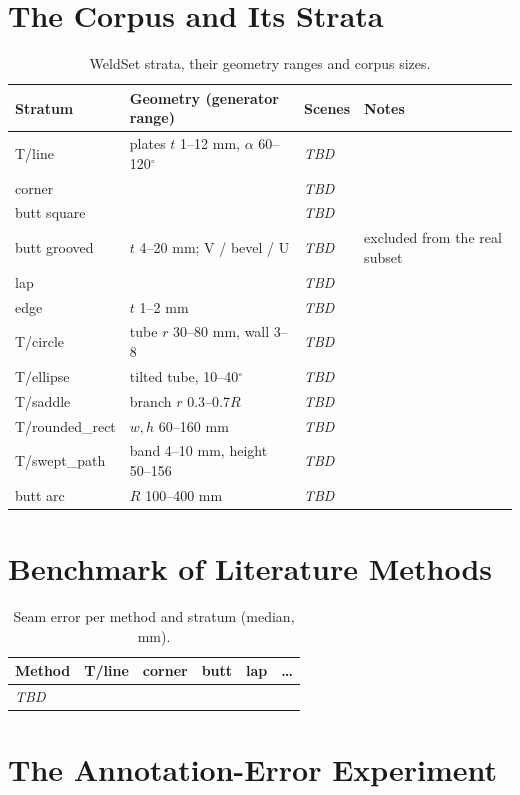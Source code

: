 \section{The Corpus and Its Strata}
\label{sec:ws_corpus}
\begin{table}[htbp]
\caption{WeldSet strata, their geometry ranges and corpus sizes.}
\label{tab:ws_strata}
\centering\small
\begin{tabular}{@{}llll@{}}
\toprule
Stratum & Geometry (generator range) & Scenes & Notes \\
\midrule
T/line & plates $t$ 1--12 mm, $\alpha$ 60--120$^\circ$ & \textit{TBD} & \\
corner & & \textit{TBD} & \\
butt square & & \textit{TBD} & \\
butt grooved & $t$ 4--20 mm; V / bevel / U & \textit{TBD} & excluded from the real subset \\
lap & & \textit{TBD} & \\
edge & $t$ 1--2 mm & \textit{TBD} & \\
T/circle & tube $r$ 30--80 mm, wall 3--8 & \textit{TBD} & \\
T/ellipse & tilted tube, 10--40$^\circ$ & \textit{TBD} & \\
T/saddle & branch $r$ 0.3--0.7$R$ & \textit{TBD} & \\
T/rounded\_rect & $w,h$ 60--160 mm & \textit{TBD} & \\
T/swept\_path & band 4--10 mm, height 50--156 & \textit{TBD} & \\
butt arc & $R$ 100--400 mm & \textit{TBD} & \\
\bottomrule
\end{tabular}
\end{table}

\section{Benchmark of Literature Methods}
\label{sec:ws_benchmark}
\begin{table}[htbp]
\caption{Seam error per method and stratum (median, mm).}
\label{tab:ws_benchmark}
\centering\small
\begin{tabular}{@{}lccccc@{}}
\toprule
Method & T/line & corner & butt & lap & \ldots \\
\midrule
\textit{TBD} & & & & & \\
\bottomrule
\end{tabular}
\end{table}

\section{The Annotation-Error Experiment}
\label{sec:ws_annotation}
